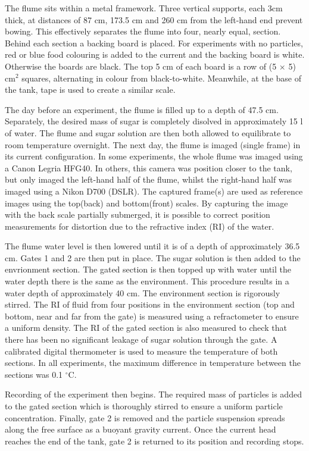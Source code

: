 \documentclass[authoryear,preprint,review,12pt]{elsarticle}
\begin{document}
The flume sits within a metal framework. Three vertical supports, each 3cm thick, at distances of 87 cm, 173.5 cm and 260 cm from the left-hand end prevent bowing. This effectively separates the flume into four, nearly equal, section. Behind each section a backing board is placed. For experiments with no particles, red or blue food colouring is added to the current and the backing board is white. Otherwise the boards are black. The top 5 cm of each board is a row of (5 $\times$ 5) cm$^{2}$ squares, alternating in colour from black-to-white. Meanwhile, at the base of the tank, tape is used to create a similar scale.

The day before an experiment, the flume is filled up to a depth of 47.5 cm. Separately, the desired mass of sugar is completely disolved in approximately 15 l of water. The flume and sugar solution are then both allowed to equilibrate to room temperature overnight. The next day, the flume is imaged (single frame) in its current configuration. In some experiments, the whole flume was imaged using a Canon Legria HFG40. In others, this camera was position closer to the tank, but only imaged the left-hand half of the flume, whilst the right-hand half was imaged using a Nikon D700 (DSLR). The captured frame(s) are used as reference images using the top(back) and bottom(front) scales. By capturing the image with the back scale partially submerged, it is possible to correct position measurements for distortion due to the refractive index (RI) of the water.

The flume water level is then lowered until it is of a depth of approximately 36.5 cm. Gates 1 and 2 are then put in place. The sugar solution is then added to the envrionment section. The gated section is then topped up with water until the water depth there is the same as the environment. This procedure results in a water depth of approximately 40 cm. The environment section is rigorously stirred. The RI of fluid from four positions in the environment section (top and bottom, near and far from the gate) is measured using a refractometer to ensure a uniform density. The RI of the gated section is also measured to check that there has been no significant leakage of sugar solution through the gate. A calibrated digital thermometer is used to measure the temperature of both sections. In all experiments, the maximum difference in temperature between the sections was 0.1 $^{\circ}$C.

Recording of the experiment then begins. The required mass of particles is added to the gated section which is thoroughly stirred to ensure a uniform particle concentration. Finally, gate 2 is removed and the particle suspension spreads along the free surface as a buoyant gravity current. Once the current head reaches the end of the tank, gate 2 is returned to its position and recording stops. 
\end{document}
